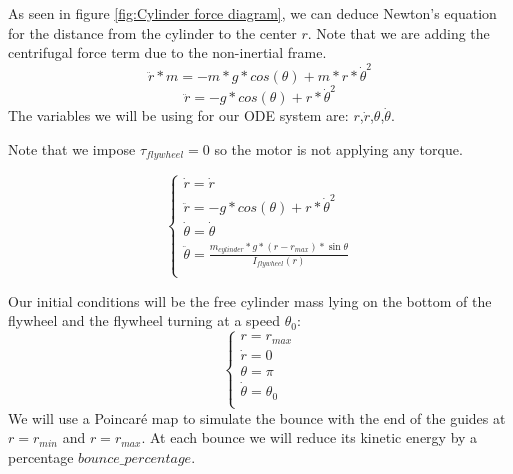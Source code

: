 As seen in figure \ref{fig:Cylinder force diagram}, we can deduce Newton's equation for the distance from the cylinder to the center $r$. Note that we are adding the centrifugal force term due to the non-inertial frame.
\[\ddot{r} * m = -m * g * cos(\theta) + m * r * \dot{\theta}^2 \]
\[\ddot{r} = -g * cos(\theta) + r * \dot{\theta}^2 \]
The variables we will be using for our ODE system are: $r$,$\dot{r}$,$\theta$,$\dot{\theta}$.

Note that we impose $\tau_{flywheel} = 0$ so the motor is not applying any torque.

\[
\begin{cases}
    \dot{r} = \dot{r}\\
    \ddot{r} = -g * cos(\theta) + r * \dot{\theta}^2\\
    \dot{\theta} = \dot{\theta}\\
    \ddot{\theta} = \frac{m_{cylinder} * g * (r - r_{max}) * \sin{\theta}}{I_{flywheel}(r)} \\    
\end{cases}
\]


Our initial conditions will be the free cylinder mass lying on the bottom of the flywheel and the flywheel turning at a speed $\theta_0$:
\[
    \begin{cases}
        r = r_{max} \\
        \dot{r} = 0\\
        \theta = \pi\\
        \dot{\theta} = \theta_0\\
    \end{cases}
\]
We will use a Poincar\'e map to simulate the bounce with the end of the guides at $r=r_{min}$ and $r=r_{max}$. At each bounce we will reduce its kinetic energy by a percentage $bounce\_percentage$.

